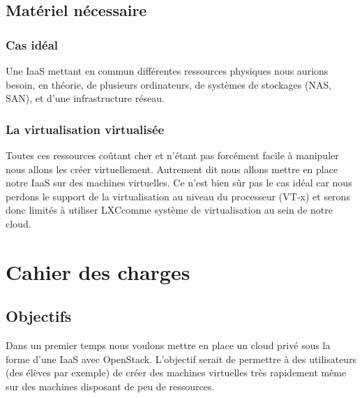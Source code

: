 \documentclass{report}
\begin{document}
\section{Matériel nécessaire}
\subsection{Cas idéal}
Une IaaS mettant en commun différentes ressources physiques nous aurions besoin, en théorie, de plusieurs ordinateurs, de systèmes de stockages (NAS\footnotemark[5], SAN\footnotemark[6]), et d'une infrastructure réseau.


\subsection{La virtualisation virtualisée}
Toutes ces ressources coûtant cher et n'étant pas forcément facile à manipuler nous allons les créer virtuellement. Autrement dit nous allons mettre en place notre IaaS sur des machines virtuelles. Ce n'est bien sûr pas le cas idéal car nous perdons le support de la virtualisation au niveau du processeur (VT-x\footnotemark[7]) et serons donc limités à utiliser LXC\footnotemark[8] comme système de virtualisation au sein de notre cloud.


\chapter{Cahier des charges}
\section{Objectifs}
Dans un premier temps nous voulons mettre en place un cloud privé sous la forme d'une IaaS avec OpenStack. L'objectif serait de permettre à des utilisateurs (des élèves par exemple) de créer des machines virtuelles très rapidement même sur des machines disposant de peu de ressources.\\
\end{document}
